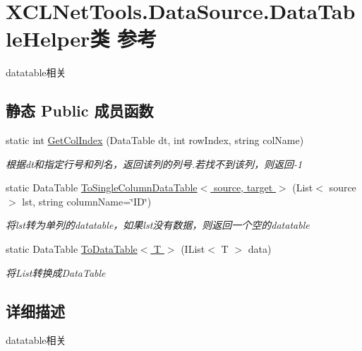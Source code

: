 \hypertarget{class_x_c_l_net_tools_1_1_data_source_1_1_data_table_helper}{\section{X\-C\-L\-Net\-Tools.\-Data\-Source.\-Data\-Table\-Helper类 参考}
\label{class_x_c_l_net_tools_1_1_data_source_1_1_data_table_helper}
}


datatable相关  


\subsection*{静态 Public 成员函数}
\begin{DoxyCompactItemize}
\item 
static int \hyperlink{class_x_c_l_net_tools_1_1_data_source_1_1_data_table_helper_a511bf3d8ae5d373939b661f561cf5960}{Get\-Col\-Index} (Data\-Table dt, int row\-Index, string col\-Name)
\begin{DoxyCompactList}\small\item\em 根据dt和指定行号和列名，返回该列的列号.\-若找不到该列，则返回-\/1 \end{DoxyCompactList}\item 
static Data\-Table \hyperlink{class_x_c_l_net_tools_1_1_data_source_1_1_data_table_helper_a1857097ac0d5c70dc583967cfab013cd}{To\-Single\-Column\-Data\-Table$<$ source, target $>$} (List$<$ source $>$ lst, string column\-Name=\char`\"{}I\-D\char`\"{})
\begin{DoxyCompactList}\small\item\em 将lst转为单列的datatable，如果lst没有数据，则返回一个空的datatable \end{DoxyCompactList}\item 
static Data\-Table \hyperlink{class_x_c_l_net_tools_1_1_data_source_1_1_data_table_helper_a260f6bf6cc10a4de3e39c37c02533d9d}{To\-Data\-Table$<$ T $>$} (I\-List$<$ T $>$ data)
\begin{DoxyCompactList}\small\item\em 将\-List转换成\-Data\-Table \end{DoxyCompactList}\end{DoxyCompactItemize}


\subsection{详细描述}
datatable相关 



